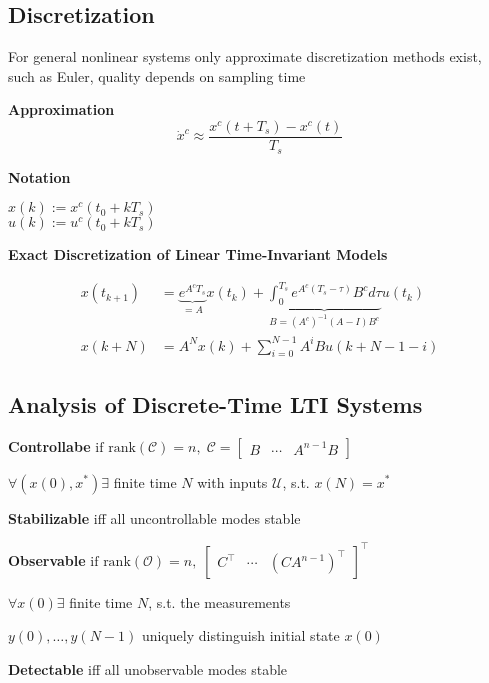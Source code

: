 \subsection{Discretization}

For general nonlinear systems only approximate discretization methods
exist, such as Euler, quality depends on sampling time

\begin{minipage}[t]{0.5\linewidth}
	\textbf{Approximation}\\
	\[
		\dot{x}^c \approx \frac{x^c(t + T_s)-x^c(t)}{T_s}
	\]
\end{minipage}
\begin{minipage}[t]{0.45\linewidth}
	\textbf{Notation}

	$x(k):= x^c(t_0+kT_s)$\\
	$u(k):= u^c(t_0+kT_s)$\\
\end{minipage}

\textbf{Exact Discretization of Linear Time-Invariant Models}

\begin{align*}
	x(t_{k+1}) & =
	\underbrace{e^{A^c T_s}}
	_{=A} x(t_k) +
	\underbrace{\textstyle\int_{0}^{T_s}
		e^{A^c(T_s - \tau)}B^c d\tau}
	_{B=(A^c)^{-1}(A-I)B^c} u(t_k)
	\\
	x(k+N)     & = A^N x(k) + \textstyle\sum_{i=0}^{N-1}
	A^i B u(k+N-1-i)
\end{align*}


\subsection{Analysis of Discrete-Time LTI Systems}

\textbf{Controllabe}
$
	\text{if rank}(\mathcal{C}) = n
	,\;
	\mathcal{C} =
	\begin{bmatrix}
		B & \cdots & A^{n-1} B
	\end{bmatrix}
$

$\forall(x(0),x^*)\exists$ finite time $N$
with inputs $\mathcal{U}$, s.t. $x(N)=x^*$

\textbf{Stabilizable} iff all uncontrollable modes stable

\textbf{Observable}
$
	\text{if rank}(\mathcal{O}) = n
	,\;
	\begin{bmatrix}
		C^\top & \cdots & (CA^{n-1})^\top
	\end{bmatrix}^\top
$

$\forall x(0)\exists$ finite time $N$, s.t. the measurements

$y(0), \dots, y(N-1)$
uniquely distinguish initial state $x(0)$

\textbf{Detectable} iff all unobservable modes stable

